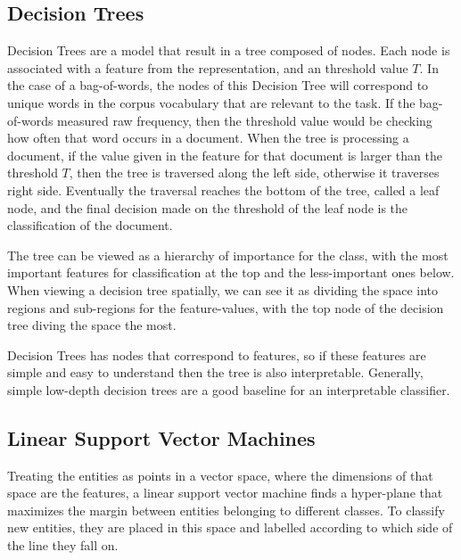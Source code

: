 \subsection{Decision Trees}\label{bg:trees}

Decision Trees are a model that result in a tree composed of nodes. Each node is associated with a feature from the representation, and  an  threshold value $T$. In the case of a bag-of-words, the nodes of this Decision Tree will correspond to unique words in the corpus vocabulary that are relevant to the task. If the bag-of-words measured raw frequency, then the threshold value would be checking how often that word occurs in  a document.  When the tree is processing a document, if the value given in the feature for that document is larger than the threshold $T$, then the tree is traversed along the left side, otherwise it traverses right side. Eventually the traversal reaches the bottom of the tree, called a leaf node, and the final  decision made on the threshold of the leaf node is the classification of the document. 

The tree can be viewed as a hierarchy of importance for the class, with the most important features for classification at the top and the less-important ones below. When viewing a decision tree spatially, we can see it as dividing the space into regions and sub-regions for the feature-values, with the top node of the decision tree diving the space the most.

Decision Trees has nodes that correspond to features, so if these features are simple and easy to understand then the tree is also interpretable. Generally, simple low-depth decision trees are a good baseline for an interpretable classifier. 




\subsection{Linear Support Vector Machines}\label{bg:svm}

Treating the entities as points in a vector space, where the dimensions of that space are the features,  a linear support vector machine  finds a hyper-plane that maximizes the margin between entities belonging to different classes. To classify new entities, they are placed in this space and labelled according to which side of the line they fall on. %

